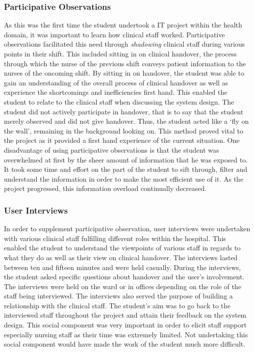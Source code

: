 \subsubsection{Participative Observations}
As this was the first time the student undertook a IT project within the health domain, it was important to learn how clinical staff worked. Participative observations facilitated this need through \emph{shadowing} clinical staff during various points in their shift. This included sitting in on clinical handover, the process through which the nurse of the previous shift conveys patient information to the nurses of the oncoming shift. By sitting in on handover, the student was able to gain an understanding of the overall process of clinical handover as well as experience the shortcomings and inefficiencies first hand. This enabled the student to relate to the clinical staff when discussing the system design. 
The student did not actively participate in handover, that is to say that the student merely observed and did not give handover. Thus, the student acted like a `fly on the wall', remaining in the background looking on. This method proved vital to the project as it provided a first hand experience of the current situation. One disadvantage of using participative observations is that the student was overwhelmed at first by the sheer amount of information that he was exposed to. It took some time and effort on the part of the student to sift through, filter and understand the information in order to make the most efficient use of it. As the project progressed, this information overload continually decreased.

\subsubsection{User Interviews}
In order to supplement participative observation, user interviews were undertaken with various clinical staff fulfilling different roles within the hospital. This enabled the student to understand the viewpoints of various staff in regards to what they do as well as their view on clinical handover. The interviews lasted between ten and fifteen minutes and were held casually. During the interviews, the student asked specific questions about handover and the user's involvement. The interviews were held on the ward or in offices depending on the role of the staff being interviewed. The interviews also served the purpose of building a relationship with the clinical staff. The student's aim was to go back to the interviewed staff throughout the project and attain their feedback on the system design. This social component was very important in order to elicit staff support especially nursing staff as their time was extremely limited. Not undertaking this social component would have made the work of the student much more difficult.

